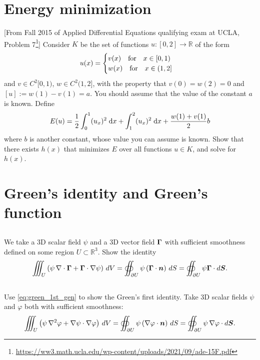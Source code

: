 \documentclass[11pt,letterpaper]{report}
\begin{document}
\section{Energy minimization}
[From Fall 2015 of Applied Differential Equations qualifying exam at UCLA, Problem 7\footnote{\url{https://ww3.math.ucla.edu/wp-content/uploads/2021/09/ade-15F.pdf}}] 
Consider $K$ be the set of functions $u: [0, 2] \to \mathbb{R}$ of the form 
\begin{align}
    u(x) = \begin{cases}
        v(x)\quad \mbox{for} \quad x\in[0,1)\\
        w(x)\quad \mbox{for} \quad x\in(1,2]
    \end{cases}
\end{align} 
and $v\in C^2[0,1)$, $w\in C^2(1,2]$, with the property that $v(0) = w(2) = 0$ and $[u] := w(1) - v(1) = a$. You should assume that the value of the constant $a$ is known. Define
\begin{align}
    E(u) = \frac{1}{2}\int_0^1 (u_x)^2\;\mathrm{d} x+\int^2_1 (u_x)^2\;\mathrm{d} x+\frac{w(1)+v(1)}{2}b
\end{align}
where $b$ is another constant, whose value you can assume is known. Show that there exists $h(x)$ that minimizes $E$ over all functions $u\in K$, and solve for $h(x)$.

\section{Green's identity and Green's function}
\subsection{}
We take a 3D scalar field $\psi$ and a 3D vector field $\boldsymbol{\Gamma}$ with sufficient smoothness defined on some region $U \subset \mathbb{R}^3$. Show the identity
\begin{align}
    \iiint_U \left( \psi \, \nabla \cdot \boldsymbol{\Gamma} + \boldsymbol{\Gamma} \cdot \nabla \psi\right)\, dV  = \oiint_{\partial U} \psi \left( \boldsymbol{\Gamma} \cdot \boldsymbol{n} \right)\, dS=\oiint_{\partial U}\psi\boldsymbol{\Gamma}\cdot d\boldsymbol{S}.\label{eq:green_1st_gen}
\end{align}

\subsection{}
Use \eqref{eq:green_1st_gen} to show the Green's first identity. Take 3D scalar fields $\psi$ and $\varphi$ both with sufficient smoothness:
\begin{align}
    \iiint_U \left( \psi \, \nabla^2 \varphi + \nabla \psi \cdot \nabla \varphi \right)\, dV  = \oiint_{\partial U} \psi \left( \nabla \varphi \cdot \boldsymbol{n} \right)\, dS=\oiint_{\partial U}\psi\,\nabla\varphi\cdot d\boldsymbol{S}.
\end{align}
\end{document}
